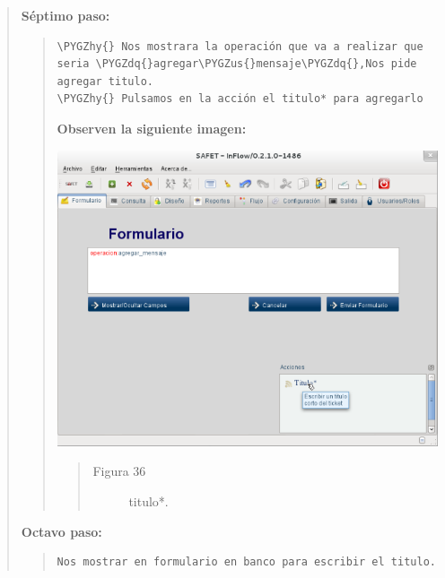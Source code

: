 \documentclass[letterpaper,11pt,spanish]{sphinxmanual}
\def\PYGZus{\char`\_}
\def\PYGZhy{\char`\-}
\def\PYGZdq{\char`\"}
\begin{document}
\begin{quote}
\begin{quote}
\begin{quote}
\begin{description}
\end{description}\end{quote}
\end{quote}

\textbf{Séptimo paso:}
\begin{quote}

\begin{Verbatim}[commandchars=\\\{\}]
\PYGZhy{} Nos mostrara la operación que va a realizar que seria \PYGZdq{}agregar\PYGZus{}mensaje\PYGZdq{},Nos pide agregar titulo.
\PYGZhy{} Pulsamos en la acción el titulo* para agregarlo
\end{Verbatim}

\textbf{Observen la siguiente imagen:}

\includegraphics{inflow11.png}
\begin{quote}\begin{description}
\item[{Figura 36}] \leavevmode
titulo*.

\end{description}\end{quote}
\end{quote}

\textbf{Octavo paso:}
\begin{quote}

\begin{Verbatim}[commandchars=\\\{\}]
Nos mostrar en formulario en banco para escribir el titulo.
\end{Verbatim}


\end{quote}
\end{quote}
\end{document}
